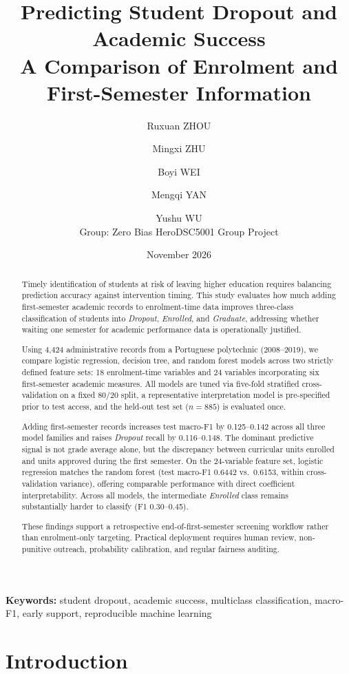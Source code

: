 \documentclass[11pt,a4paper]{article}
\title{Predicting Student Dropout and Academic Success\\
\large A Comparison of Enrolment and First-Semester Information}
\author{%
  Ruxuan ZHOU \and Mingxi ZHU \and Boyi WEI \and Mengqi YAN \and Yushu WU\\[4pt]
  \normalsize Group: Zero Bias Hero\quad DSC5001 Group Project
}
\date{November 2026}
\newcommand{\Dropout}{\textit{Dropout}}
\newcommand{\Enrolled}{\textit{Enrolled}}
\newcommand{\Graduate}{\textit{Graduate}}
\begin{document}
\maketitle

\begin{abstract}
Timely identification of students at risk of leaving higher education requires balancing prediction
accuracy against intervention timing. This study evaluates how much adding first-semester academic
records to enrolment-time data improves three-class classification of students into \Dropout{},
\Enrolled{}, and \Graduate{}, addressing whether waiting one semester for academic performance data
is operationally justified.

Using 4,424 administrative records from a Portuguese polytechnic (2008--2019), we compare logistic
regression, decision tree, and random forest models across two strictly defined feature sets: 18
enrolment-time variables and 24 variables incorporating six first-semester academic measures. All
models are tuned via five-fold stratified cross-validation on a fixed 80/20 split, a representative
interpretation model is pre-specified prior to test access, and the held-out test set ($n = 885$) is
evaluated once.

Adding first-semester records increases test macro-F1 by 0.125--0.142 across all three model families
and raises \Dropout{} recall by 0.116--0.148. The dominant predictive signal is not grade average
alone, but the discrepancy between curricular units enrolled and units approved during the first
semester. On the 24-variable feature set, logistic regression matches the random forest (test
macro-F1 0.6442 vs.\ 0.6153, within cross-validation variance), offering comparable performance with
direct coefficient interpretability. Across all models, the intermediate \Enrolled{} class remains
substantially harder to classify (F1 0.30--0.45).

These findings support a retrospective end-of-first-semester screening workflow rather than
enrolment-only targeting. Practical deployment requires human review, non-punitive outreach,
probability calibration, and regular fairness auditing.
\end{abstract}

\noindent\textbf{Keywords:} student dropout, academic success, multiclass classification,
macro-F1, early support, reproducible machine learning

\tableofcontents
\newpage

\section{Introduction}
\end{document}
